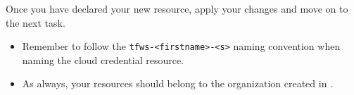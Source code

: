 Once you have declared your new resource, apply your changes and move on to the next task.

\begin{warn}
  \begin{itemize}
    \item Remember to follow the \texttt{tfws-<firstname>-<s>} naming convention when naming the cloud credential resource.
    \item As always, your resources should belong to the organization created in .
  \end{itemize}
\end{warn}

